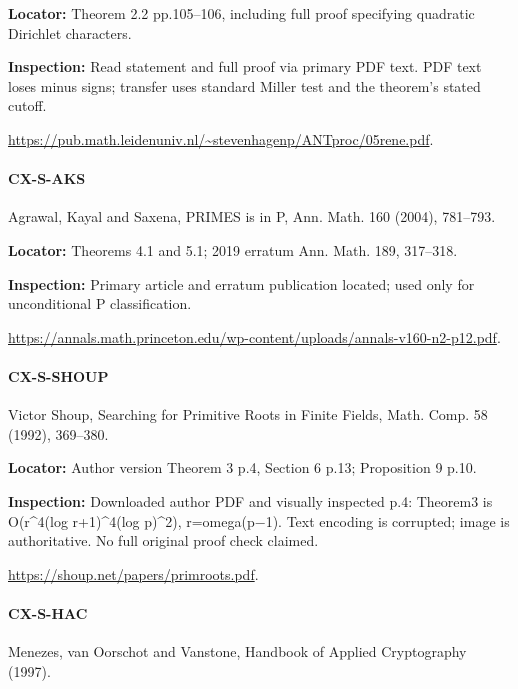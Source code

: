 \documentclass[11pt,a4paper]{article}
\begin{document}
\textbf{Locator:} Theorem 2.\allowbreak{}2 pp.\allowbreak{}105–\allowbreak{}106, including full proof specifying quadratic Dirichlet characters.

\textbf{Inspection:} Read statement and full proof via primary PDF text.\allowbreak{} PDF text loses minus signs; transfer uses standard Miller test and the theorem’s stated cutoff.\allowbreak{}

\url{https://pub.math.leidenuniv.nl/~stevenhagenp/ANTproc/05rene.pdf}.

\paragraph{CX-S-AKS} Agrawal, Kayal and Saxena, PRIMES is in P, Ann.\allowbreak{} Math.\allowbreak{} 160 (2004), 781–\allowbreak{}793.

\textbf{Locator:} Theorems 4.\allowbreak{}1 and 5.\allowbreak{}1; 2019 erratum Ann.\allowbreak{} Math.\allowbreak{} 189, 317–\allowbreak{}318.

\textbf{Inspection:} Primary article and erratum publication located; used only for unconditional P classification.\allowbreak{}

\url{https://annals.math.princeton.edu/wp-content/uploads/annals-v160-n2-p12.pdf}.

\paragraph{CX-S-SHOUP} Victor Shoup, Searching for Primitive Roots in Finite Fields, Math.\allowbreak{} Comp.\allowbreak{} 58 (1992), 369–\allowbreak{}380.

\textbf{Locator:} Author version Theorem 3 p.\allowbreak{}4, Section 6 p.\allowbreak{}13; Proposition 9 p.\allowbreak{}10.

\textbf{Inspection:} Downloaded author PDF and visually inspected p.\allowbreak{}4:\allowbreak{} Theorem3 is O(r\textasciicircum{}4(log r+1)\textasciicircum{}4(log p)\textasciicircum{}2), r=omega(p\ensuremath{-}1).\allowbreak{} Text encoding is corrupted; image is authoritative.\allowbreak{} No full original proof check claimed.\allowbreak{}

\url{https://shoup.net/papers/primroots.pdf}.

\paragraph{CX-S-HAC} Menezes, van Oorschot and Vanstone, Handbook of Applied Cryptography (1997).
\end{document}
